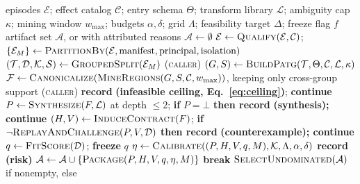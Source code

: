 \begin{algorithm}[t]
\caption{\textsc{Compile} --- the compile-or-retire cascade. Every candidate is either
registered or assigned an attributed \retire, so refusal accounting remains explicit.
Stages marked \textsc{(caller)} are separate library entry points run in this order
rather than steps inside one function. Freezing applies per compatible partition;
certifying several partitions requires an additional allocation of confidence.}
\label{alg:compile}
\scriptsize
\begin{algorithmic}[1]
\Require episodes $\mathcal{E}$; effect catalog $\mathcal{C}$; entry schema $\Theta$;
         transform library $\mathcal{L}$; ambiguity cap $\kappa$; mining window
         $w_{\max}$; budgets $\alpha,\delta$; grid $\Lambda$; feasibility target $\Delta$; freeze flag $f$
\Ensure artifact set $\mathcal{A}$, or \retire{} with attributed reasons
\State $\mathcal{A}\gets\emptyset$
\State $\mathcal{E}\gets\textsc{Qualify}(\mathcal{E},\mathcal{C})$;\quad
       $\{\mathcal{E}_M\}\gets\textsc{PartitionBy}(\mathcal{E},\text{manifest},
       \text{principal},\text{isolation})$
  \State $(\mathcal{T},\mathcal{D},\mathcal{K},\mathcal{S})\gets
         \textsc{GroupedSplit}(\mathcal{E}_M)$ \hfill\textsc{(caller)}
  \State $(G,S)\gets\textsc{BuildPatg}(\mathcal{T},\Theta,\mathcal{C},\mathcal{L},\kappa)$ 
  \State $\mathcal{F}\gets\textsc{Canonicalize}(\textsc{MineRegions}
         (G,S,\mathcal{C},w_{\max}))$, keeping only cross-group support
   \hfill\textsc{(caller)}
     \State \textbf{record} \retire{} \textbf{(infeasible ceiling, Eq.~\eqref{eq:ceiling})};
            \textbf{continue}
  \EndIf
    \State $P\gets\textsc{Synthesize}(F,\mathcal{L})$ at depth $\le 2$;\quad
           \textbf{if} $P=\bot$ \textbf{then record} \retire{} \textbf{(synthesis); continue}
    \State $(H,V)\gets\textsc{InduceContract}(F)$;\quad
           \textbf{if} $\neg\textsc{ReplayAndChallenge}(P,V,\mathcal{D})$
           \textbf{then record} \retire{} \textbf{(counterexample); continue}
    \State $q\gets\textsc{FitScore}(\mathcal{D})$; \textbf{freeze} $q$
    \State $\eta\gets\textsc{Calibrate}((P,H,V,q,M),\mathcal{K},\Lambda,\alpha,\delta)$
    \If{$\eta=\bot$}
      \State \textbf{record} \retire{} \textbf{(risk)}
    \Else
      \State $\mathcal{A}\gets\mathcal{A}\cup\{\textsc{Package}(P,H,V,q,\eta,M)\}$
    \EndIf
     \State \textbf{break} 
    \EndIf
  \EndFor
\EndFor
\State \Return $\textsc{SelectUndominated}(\mathcal{A})$ if nonempty, else \retire
\end{algorithmic}
\end{algorithm}
